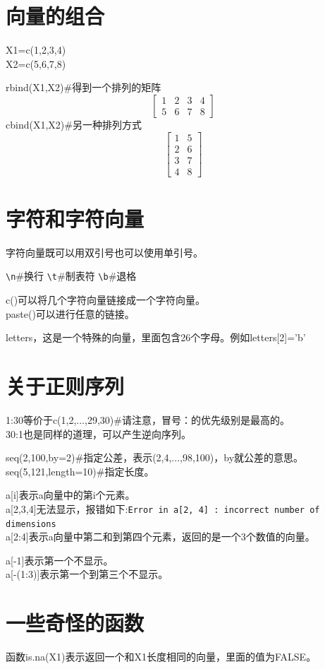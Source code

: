 \documentclass[a4paper,12pt]{ctexbook}
\begin{document}
\begin{flushleft}
\section{向量的组合}
X1=c(1,2,3,4)\\
X2=c(5,6,7,8)

rbind(X1,X2)\#得到一个排列的矩阵
$$\begin{bmatrix}
	1&2&3&4 \\
	5&6&7&8 
\end{bmatrix}$$
cbind(X1,X2)\#另一种排列方式	
$$\begin{bmatrix}
1&5\\
2&6\\
3&7\\
4&8
\end{bmatrix}$$

\section{字符和字符向量}
字符向量既可以用双引号也可以使用单引号。

\verb|\n|\#换行
\verb|\t|\#制表符
\verb|\b|\#退格

c()可以将几个字符向量链接成一个字符向量。\\
paste()可以进行任意的链接。

letters，这是一个特殊的向量，里面包含26个字母。例如letters[2]='b'

\section{关于正则序列}
1:30等价于c(1,2,...,29,30)\#请注意，冒号：的优先级别是最高的。\\
30:1也是同样的道理，可以产生逆向序列。

seq(2,100,by=2)\#指定公差，表示(2,4,...,98,100)，by就公差的意思。\\
seq(5,121,length=10)\#指定长度。

a[i]表示a向量中的第i个元素。\\
a[2,3,4]无法显示，报错如下:\verb|Error in a[2, 4] : incorrect number of dimensions|\\
a[2:4]表示a向量中第二和到第四个元素，返回的是一个3个数值的向量。

a[-1]表示第一个不显示。\\
a[-(1:3)]表示第一个到第三个不显示。

\section{一些奇怪的函数}
函数is.na(X1)表示返回一个和X1长度相同的向量，里面的值为FALSE。


\end{flushleft}
\end{document}
